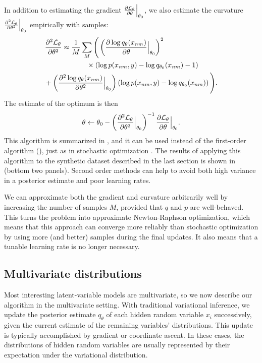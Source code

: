 In addition to estimating the gradient $\frac{\partial \mathcal{L}_\theta }{\partial \theta} \Bigr|_{\theta_0}$, we also estimate the curvature
$\frac{\partial^2 \mathcal{L}_\theta }{\partial {\theta}^2} \Bigr|_{\theta_0}$
empirically with samples:
\begin{align}
  \label{eq:empirical_second_order_estimates}
  \displaystyle \partll{\mathcal{L}_\theta }{\theta} & \approx
  \frac{1}{M} \sum_M \Bigg(
  \left( \partl{\log q_\theta(x_{nm})}{\theta} \Bigr|_{\theta_0} \right)^2 \\ \nonumber
  & \hspace{35pt} \times \left( \log p(x_{nm},  y) - \log q_{\theta_0}(x_{nm}) - 1 \right)  \\ \nonumber
 &   \hspace{-25pt} + \left( \partll{\log q_\theta(x_{nm})}{\theta} \Bigr|_{\theta_0} \right) \left( \log p(x_{nm},  y) - \log q_{\theta_0}(x_{nm}) \right) \Bigg). \nonumber
\end{align}
The estimate of the optimum is then
\begin{align}
  \displaystyle \theta \gets \theta_0 - \left( 
  \frac{\partial^2 \mathcal{L}_\theta }{\partial {\theta}^2} \Bigr|_{\theta_0}
  \right)^{-1}
  \frac{\partial \mathcal{L}_\theta }{\partial \theta} \Bigr|_{\theta_0}.
  \label{eq:second_order_updates}
\end{align}
This algorithm is summarized in
, and it can be used instead
of the first-order algorithm
(), just as in stochastic
optimization \cite{bottou:2004}.  The results of applying this
algorithm to the synthetic dataset described in the last section is
shown in  (bottom two
panels).  Second order methods can help to avoid both high variance in
a posterior estimate and poor learning rates.

We can approximate both the gradient and curvature arbitrarily well by
increasing the number of samples $M$, provided that $q$ and $p$ are
well-behaved.  This turns the problem into approximate Newton-Raphson
optimization, which means that this approach can converge more
reliably than stochastic optimization by using more (and better)
samples during the final updates.  It also means that a tunable
learning rate is no longer necessary.

\subsection{Multivariate distributions}
Most interesting latent-variable models are multivariate, so we now describe
our algorithm in the multivariate setting.  With traditional variational
inference, we update the posterior estimate $q_\theta$ of each hidden
random variable $x_i$ successively, given the current estimate of the
remaining variables' distributions.  This update is typically
accomplished by gradient or coordinate ascent.  In these cases, the
distributions of hidden random variables are usually represented by
their expectation under the variational distribution.

